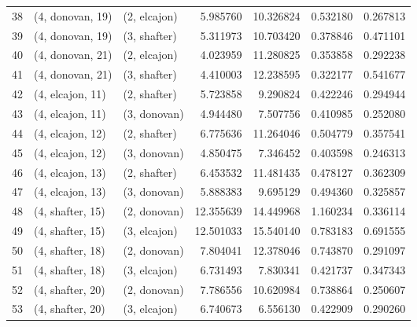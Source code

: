 \begin{tabular}{lllrrrr}
38 &  (4, donovan, 19) &     (2, elcajon) &   5.985760 &  10.326824 &   0.532180 &  0.267813 \\
39 &  (4, donovan, 19) &     (3, shafter) &   5.311973 &  10.703420 &   0.378846 &  0.471101 \\
40 &  (4, donovan, 21) &     (2, elcajon) &   4.023959 &  11.280825 &   0.353858 &  0.292238 \\
41 &  (4, donovan, 21) &     (3, shafter) &   4.410003 &  12.238595 &   0.322177 &  0.541677 \\
42 &  (4, elcajon, 11) &     (2, shafter) &   5.723858 &   9.290824 &   0.422246 &  0.294944 \\
43 &  (4, elcajon, 11) &     (3, donovan) &   4.944480 &   7.507756 &   0.410985 &  0.252080 \\
44 &  (4, elcajon, 12) &     (2, shafter) &   6.775636 &  11.264046 &   0.504779 &  0.357541 \\
45 &  (4, elcajon, 12) &     (3, donovan) &   4.850475 &   7.346452 &   0.403598 &  0.246313 \\
46 &  (4, elcajon, 13) &     (2, shafter) &   6.453532 &  11.481435 &   0.478127 &  0.362309 \\
47 &  (4, elcajon, 13) &     (3, donovan) &   5.888383 &   9.695129 &   0.494360 &  0.325857 \\
48 &  (4, shafter, 15) &     (2, donovan) &  12.355639 &  14.449968 &   1.160234 &  0.336114 \\
49 &  (4, shafter, 15) &     (3, elcajon) &  12.501033 &  15.540140 &   0.783183 &  0.691555 \\
50 &  (4, shafter, 18) &     (2, donovan) &   7.804041 &  12.378046 &   0.743870 &  0.291097 \\
51 &  (4, shafter, 18) &     (3, elcajon) &   6.731493 &   7.830341 &   0.421737 &  0.347343 \\
52 &  (4, shafter, 20) &     (2, donovan) &   7.786556 &  10.620984 &   0.738864 &  0.250607 \\
53 &  (4, shafter, 20) &     (3, elcajon) &   6.740673 &   6.556130 &   0.422909 &  0.290260 \\
\bottomrule
\end{tabular}
